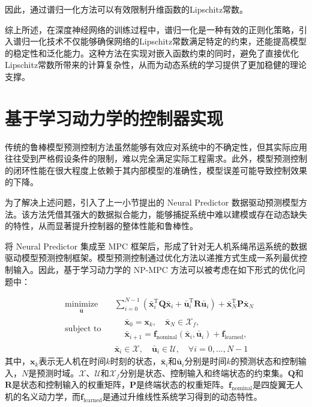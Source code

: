 \documentclass[lang=chs, degree=master, blindreview=false, winfonts=true]{yanputhesis}
\begin{document}
	因此，通过谱归一化方法可以有效限制升维函数的Lipschitz常数。

综上所述，在深度神经网络的训练过程中，谱归一化是一种有效的正则化策略，引入谱归一化技术不仅能够确保网络的Lipschitz常数满足特定的约束，还能提高模型的稳定性和泛化能力。这种方法在实现对嵌入函数约束的同时，避免了直接优化Lipschitz常数所带来的计算复杂性，从而为动态系统的学习提供了更加稳健的理论支撑。

\section{基于学习动力学的控制器实现}

传统的鲁棒模型预测控制方法虽然能够有效应对系统中的不确定性，但其实际应用往往受到严格假设条件的限制，难以完全满足实际工程需求。此外，模型预测控制的闭环性能在很大程度上依赖于其内部模型的准确性，模型误差可能导致控制效果的下降。

为了解决上述问题，引入了上一小节提出的 Neural Predictor 数据驱动预测模型方法。该方法凭借其强大的数据拟合能力，能够捕捉系统中难以建模或存在动态缺失的特性，从而显著提升控制器的整体性能和鲁棒性。

将 Neural Predictor 集成至 MPC 框架后，形成了针对无人机系绳吊运系统的数据驱动模型预测控制框架。模型预测控制通过优化方法以递推方式生成一系列最优控制输入。因此，基于学习动力学的 NP-MPC 方法可以被考虑在如下形式的优化问题中：

\begin{equation}
	\begin{aligned} \label{nmpc}
		&\operatorname*{minimize}_{\bm{\bar{u}}}& & \sum_{i=0}^{N-1}\left(\bm{\bar{x}}_i^\mathrm{T}\bm{Q}\bm{\bar{x}}_i + \bm{\bar{u}}_i^\mathrm{T}\bm{R}\bm{\bar{u}}_i\right) + \bm{\bar{x}}_N^\mathrm{T}\bm{P}\bm{\bar{x}}_N  \\
		&\text{subject to}& & \begin{aligned}
			&\bm{\bar{x}}_{0} = \bm{x}_k, \quad \bm{\bar{x}}_{N} \in \mathcal{X}_f, \\
			&\bm{\bar{x}}_{i+1} = \bm{f}_{\text{nominal}}(\bm{\bar{x}}_i, \bm{\bar{u}}_i) + \bm{f}_{\text{learned}},
		\end{aligned} \\
		&&& \bm{\bar{x}}_i \in \mathcal{X}, \quad \bm{\bar{u}}_i \in \mathcal{U}, \quad \forall i = 0, \ldots, N-1
	\end{aligned}
\end{equation}
其中，$\bm{x}_k$表示无人机在时间$k$时刻的状态，$\bm{\bar{x}}_i$和$\bm{\bar{u}}_i$分别是时间$k$的预测状态和控制输入，$N$是预测时域。$\mathcal{X}$、$\mathcal{U}$和$\mathcal{X}_f$分别是状态、控制输入和终端状态的约束集。$\bm{Q}$和$\bm{R}$是状态和控制输入的权重矩阵，$\bm{P}$是终端状态的权重矩阵。$\bm{f}_{\text{nominal}}$是四旋翼无人机的名义动力学，而$\bm{f}_{\text{learned}}$是通过升维线性系统学习得到的动态特性。
\end{document}
